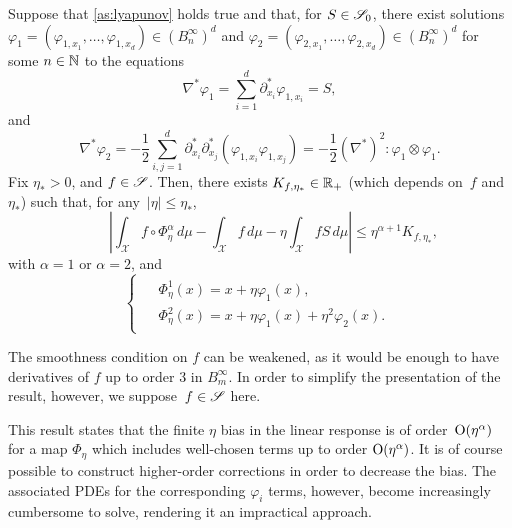 \begin{proposition}
\label{prop:gen_subtraction}
%
Suppose that \cref{as:lyapunov} holds true and that, for $S\in\S_0$, there exist solutions $\varphi_1 = (\varphi_{1,x_1},\dotsc,\varphi_{1,x_d}) \in (B^\infty_n)^d$ and $\varphi_2=(\varphi_{2,x_1},\dotsc,\varphi_{2,x_d}) \in (B^\infty_n)^d$ for some $n\in\N$ to the equations
%
\begin{equation}
	\nabla^*\varphi_1 = \sum_{i=1}^d \partial_{x_i}^* \varphi_{1,x_i} = S, %
	\label{eq:varphi1_PDE}
\end{equation}
%
and
%
\begin{equation}
	\nabla^*\varphi_2 = -\frac{1}{2}\sum_{i,j=1}^d \partial_{x_i}^*\partial_{x_j}^* (\varphi_{1,x_i}\varphi_{1,x_j}) = -\frac{1}{2}(\nabla^*)^2 \colon \varphi_1\otimes \varphi_1.
	\label{eq:varphi2_PDE}
\end{equation}
%
Fix $\eta_*>0$, and $f\in \S$. Then, there exists $K_{f,\eta_*} \in\R_+$ (which depends on~$f$ and~$\eta_*$) such that, for any~$|\eta| \leq \eta_*$,
%
\begin{equation}
	\qquad \left|\int_\mathcal{X} f\circ\Phi^\alpha_\eta \, d\mu - \int_\mathcal{X} f \, d\mu - \eta\int_\mathcal{X} f S \, d\mu\right| \leq \eta^{\alpha+1} K_{f,\eta_*},
	\label{eq:prop_eta_bias_bound}
\end{equation}
%
with $\alpha=1$ or $\alpha=2$, and
%
\begin{equation}
\begin{cases}
\begin{aligned}
	&\Phi_\eta^1(x) = x + \eta\varphi_1(x), \\
	&\Phi_\eta^2(x) = x + \eta\varphi_1(x) + \eta^2\varphi_2(x).
\end{aligned}
\end{cases}
\label{eq:Phi_alpha}
\end{equation}
%
\end{proposition}

\begin{remark}
The smoothness condition on $f$ can be weakened, as it would be enough to have derivatives of $f$ up to order 3 in $B^\infty_m$. In order to simplify the presentation of the result, however, we suppose~$f\in \S$ here.
\end{remark}

This result states that the finite $\eta$ bias in the linear response is of order~$\bigO(\eta^{\alpha})$ for a map $\Phi_\eta$ which includes well-chosen terms up to order $\bigO(\eta^\alpha)$. It is of course possible to construct higher-order corrections in order to decrease the bias. The associated PDEs for the corresponding $\varphi_i$ terms, however, become increasingly cumbersome to solve, rendering it an impractical approach.

